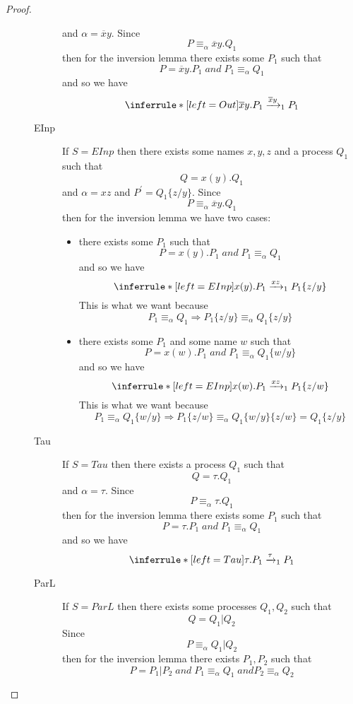 \begin{theorem}
\begin{proof}
\begin{description}
\begin{description}
	    and $\alpha=\overline{x}y$. Since 
	    \[
	      P\equiv_{\alpha}\overline{x}y.Q_{1}
	    \]
	    then for the inversion lemma there exists some $P_{1}$ such that 
	    \[
	      P=\overline{x}y.P_{1}\; and\; P_{1}\equiv_{\alpha}Q_{1}
	    \]
	    and so we have
	    \[
	      \inferrule* [left=Out]{
	      }{
		\overline{x}y.P_{1}\xrightarrow{\overline{x}y}_{1}P_{1}
	      }
	    \]
	  \item[EInp]
	    If $S=EInp$ then there exists some names $x,y,z$ and a process $Q_{1}$ such that 
	    \[
	      Q=x(y).Q_{1}
	    \]
	    and $\alpha=xz$ and $P^{'}=Q_{1}\{z/y\}$. Since 
	    \[
	      P\equiv_{\alpha}\overline{x}y.Q_{1}
	    \]
	    then for the inversion lemma we have two cases:
	    \begin{itemize}
	      \item 
		there exists some $P_{1}$ such that 
		\[
		  P=x(y).P_{1}\; and\; P_{1}\equiv_{\alpha}Q_{1}
		\]
		and so we have
		\[
		  \inferrule* [left=EInp]{
		  }{
		    x(y).P_{1}\xrightarrow{xz}_{1}P_{1}\{z/y\}
		  }
		\]
		This is what we want because 
		\[
		  P_{1}\equiv_{\alpha}Q_{1}\Rightarrow P_{1}\{z/y\}\equiv_{\alpha}Q_{1}\{z/y\}
		\]
	      \item
		there exists some $P_{1}$ and some name $w$ such that 
		\[
		  P=x(w).P_{1}\; and\; P_{1}\equiv_{\alpha}Q_{1}\{w/y\}
		\]
		and so we have
		\[
		  \inferrule* [left=EInp]{
		  }{
		    x(w).P_{1}\xrightarrow{x z}_{1}P_{1}\{z/w\}
		  }
		\]
		This is what we want because 
		\[
		  P_{1}\equiv_{\alpha}Q_{1}\{w/y\} \Rightarrow P_{1}\{z/w\}\equiv_{\alpha}Q_{1}\{w/y\}\{z/w\}=Q_{1}\{z/y\}
		\]		
	    \end{itemize}
	  \item[Tau]
	    If $S=Tau$ then there exists a process $Q_{1}$ such that 
	    \[
	      Q=\tau.Q_{1}
	    \]
	    and $\alpha=\tau$. Since 
	    \[
	      P\equiv_{\alpha}\tau.Q_{1}
	    \]
	    then for the inversion lemma there exists some $P_{1}$ such that 
	    \[
	      P=\tau.P_{1}\; and\; P_{1}\equiv_{\alpha}Q_{1}
	    \]
	    and so we have
	    \[
	      \inferrule* [left=Tau]{
	      }{
		\tau.P_{1}\xrightarrow{\tau}_{1}P_{1}
	      }
	    \]
	  \item[ParL]
	    If $S=ParL$ then there exists some processes $Q_{1},Q_{2}$ such that 
	    \[
	      Q=Q_{1}|Q_{2}
	    \]
	    Since 
	    \[
	      P\equiv_{\alpha}Q_{1}|Q_{2}
	    \]
	    then for the inversion lemma there exists $P_{1},P_{2}$ such that 
	    \[
	      P=P_{1}|P_{2}\; and\; P_{1}\equiv_{\alpha}Q_{1}\; and P_{2}\equiv_{\alpha}Q_{2}
\]
\end{description}
\end{description}
\end{proof}
\end{theorem}
